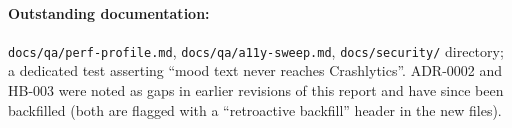 \documentclass[11pt,a4paper]{article}
\begin{document}
\paragraph{Outstanding documentation:}
\texttt{docs/qa/perf-profile.md}, \texttt{docs/qa/a11y-sweep.md},
\texttt{docs/security/} directory; a dedicated test asserting ``mood
text never reaches Crashlytics''. ADR-0002 and HB-003 were noted as
gaps in earlier revisions of this report and have since been
backfilled (both are flagged with a ``retroactive backfill'' header in
the new files).

\printbibliography[heading=bibintoc,title={References}]
\end{document}
